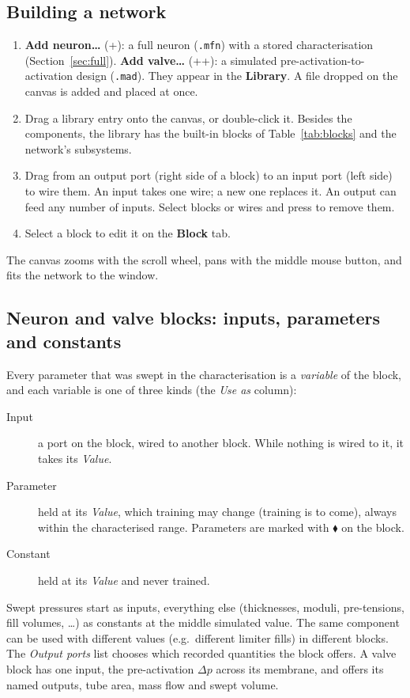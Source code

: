 \documentclass[11pt,a4paper]{article}
\newcommand{\code}[1]{\texttt{#1}}
\newcommand{\menu}[1]{\textsf{\textbf{#1}}}
\newcommand{\key}[1]{\fbox{\footnotesize\textsf{#1}}}
\begin{document}
\subsection*{Building a network}
\begin{enumerate}
\item \menu{Add neuron…} (\key{Ctrl}+\key{I}): a full neuron (\code{.mfn}) with a stored characterisation
  (Section~\ref{sec:full}). \menu{Add valve…} (\key{Ctrl}+\key{Shift}+\key{I}): a simulated pre-activation-to-activation
  design (\code{.mad}). They appear in the \menu{Library}. A file dropped on the canvas is added and placed at once.
\item Drag a library entry onto the canvas, or double-click it. Besides the components, the library has the
  built-in blocks of Table~\ref{tab:blocks} and the network's subsystems.
\item Drag from an output port (right side of a block) to an input port (left side) to wire them. An input takes one
  wire; a new one replaces it. An output can feed any number of inputs. Select blocks or wires and press
  \key{Delete} to remove them.
\item Select a block to edit it on the \menu{Block} tab.
\end{enumerate}
The canvas zooms with the scroll wheel, pans with the middle mouse button, and \key{F} fits the network to the window.

\subsection*{Neuron and valve blocks: inputs, parameters and constants}
Every parameter that was swept in the characterisation is a \emph{variable} of the block, and each variable is one of
three kinds (the \emph{Use as} column):
\begin{description}
\item[Input] a port on the block, wired to another block. While nothing is wired to it, it takes its \emph{Value}.
\item[Parameter] held at its \emph{Value}, which training may change (training is to come), always within the
  characterised range. Parameters are marked with $\blacklozenge$ on the block.
\item[Constant] held at its \emph{Value} and never trained.
\end{description}
Swept pressures start as inputs, everything else (thicknesses, moduli, pre-tensions, fill volumes, \ldots) as constants
at the middle simulated value. The same component can be used with different values (e.g.\ different limiter fills) in
different blocks. The \emph{Output ports} list chooses which recorded quantities the block offers. A valve block has
one input, the pre-activation $\Delta p$ across its membrane, and offers its named outputs, tube area, mass flow and
swept volume.
\end{document}
